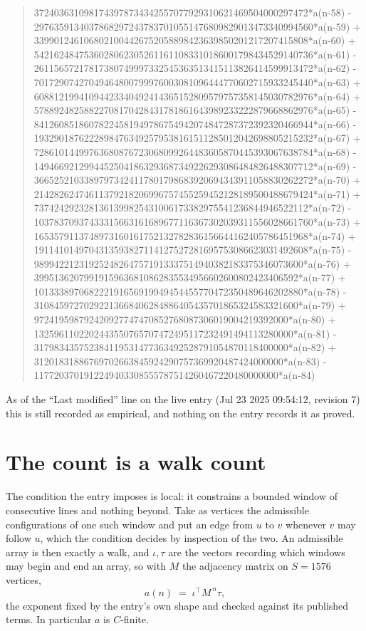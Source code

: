 \documentclass[11pt,a4paper]{article}
\theoremstyle{plain}
\theoremstyle{definition}
\begin{document}
\begin{quote}
3724036310981743978734342557077929310621469504000297472*a(n-58) - 29763591340378682972437837010551476809829013473340994560*a(n-59) + 3399012461068021004426752058898423639850201217207415808*a(n-60) + 54216248475360280623052611611083310186001798434529140736*a(n-61) - 26115657217817380749997332545363513415113826414599913472*a(n-62) - 70172907427049464800799976003081096444770602715933245440*a(n-63) + 60881219941094423340492414365152809579757358145030782976*a(n-64) + 57889248258822708170428431781861643989233222879668862976*a(n-65) - 84126085186078224581949786754942074847287372392320466944*a(n-66) - 19329018762228984763492579538161511285012042698805215232*a(n-67) + 72861014499763680876723068099264483605870445393067638784*a(n-68) - 14946692129944525041863293687349226293086484826488307712*a(n-69) - 36652521033897973424117801798683920694343911058830262272*a(n-70) + 21428262474611379218206996757455259452128189500488679424*a(n-71) + 7374242923281361399825431006173382975541236844946522112*a(n-72) - 10378370937433315663161689677116367302039311556028661760*a(n-73) + 1653579113748973160161752132782836156644162405786451968*a(n-74) + 1911410149704313593827114127527281695753086623031492608*a(n-75) - 989942212319252482647571913337514940382183375346073600*a(n-76) + 39951362079919159636810862835534956602600802423406592*a(n-77) + 101333897068222191656919949454455770472350489646202880*a(n-78) - 31084597270292213668406284886405435701865324583321600*a(n-79) + 972419598792420927747470852768087306019004219392000*a(n-80) + 1325961102202443550765707472495117232491494113280000*a(n-81) - 317983435752384119531477363492528791054870118400000*a(n-82) + 31201831886769702663845924290757369920487424000000*a(n-83) - 1177203701912249403308555787514260467220480000000*a(n-84)
\end{quote}
As of the ``Last modified'' line on the live entry (Jul 23 2025 09:54:12, revision 7) this is still
recorded as empirical, and nothing on the entry records it as proved.

\section{The count is a walk count}

The condition the entry imposes is local: it constrains a bounded window of consecutive lines and nothing beyond. Take as vertices the admissible configurations of one such window and put an edge from $u$ to $v$ whenever $v$ may follow $u$, which the condition decides by inspection of the two.
An admissible array is then exactly a walk, and $\iota,\tau$ are the vectors recording which windows may begin and end an array, so with $M$ the adjacency matrix on $S=1576$ vertices,
\[
a(n)\;=\;\iota^{\!\top}M^{\,n}\tau ,
\]
the exponent fixed by the entry's own shape and checked against its published terms. In
particular $a$ is $C$-finite.
\end{document}
